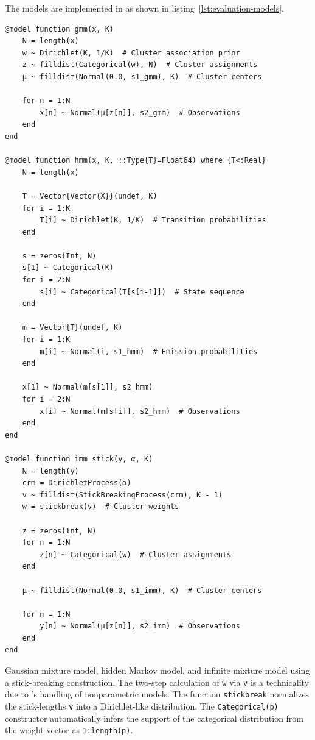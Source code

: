 The models are implemented in \dppljl{} as shown in listing~\ref{lst:evaluation-models}.
\begin{lstfloat}[p]
\begin{lstlisting}[style=lstfloat]
@model function gmm(x, K)
    N = length(x)
    w ~ Dirichlet(K, 1/K)  # Cluster association prior
    z ~ filldist(Categorical(w), N)  # Cluster assignments
    μ ~ filldist(Normal(0.0, s1_gmm), K)  # Cluster centers

    for n = 1:N
        x[n] ~ Normal(μ[z[n]], s2_gmm)  # Observations
    end
end

@model function hmm(x, K, ::Type{T}=Float64) where {T<:Real}
    N = length(x)

    T = Vector{Vector{X}}(undef, K)
    for i = 1:K
        T[i] ~ Dirichlet(K, 1/K)  # Transition probabilities
    end
    
    s = zeros(Int, N)
    s[1] ~ Categorical(K)
    for i = 2:N
        s[i] ~ Categorical(T[s[i-1]])  # State sequence
    end
    
    m = Vector{T}(undef, K)
    for i = 1:K
        m[i] ~ Normal(i, s1_hmm)  # Emission probabilities
    end
    
    x[1] ~ Normal(m[s[1]], s2_hmm)
    for i = 2:N
        x[i] ~ Normal(m[s[i]], s2_hmm)  # Observations
    end
end

@model function imm_stick(y, α, K)
    N = length(y)
    crm = DirichletProcess(α)
    v ~ filldist(StickBreakingProcess(crm), K - 1)
    w = stickbreak(v)  # Cluster weights
    
    z = zeros(Int, N)
    for n = 1:N
        z[n] ~ Categorical(w)  # Cluster assignments
    end

    μ ~ filldist(Normal(0.0, s1_imm), K)  # Cluster centers

    for n = 1:N
        y[n] ~ Normal(μ[z[n]], s2_imm)  # Observations
    end
end
\end{lstlisting}
  \caption{Gaussian mixture model, hidden Markov model, and infinite mixture model using a
    stick-breaking construction.  The two-step calculation of \texttt{w} via \texttt{v} is a
    technicality due to \turingjl{}'s handling of nonparametric models.  The function
    \texttt{stickbreak} normalizes the stick-lengths \texttt{v} into a Dirichlet-like distribution.
    The \texttt{Categorical(p)} constructor automatically infers the support of the categorical
    distribution from the weight vector as \texttt{1:length(p)}.}
  \label{lst:evaluation-models}
\end{lstfloat}
